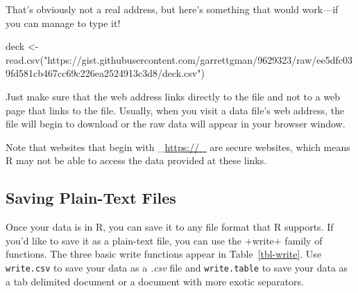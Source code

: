 \documentclass[
  letterpaper,
  DIV=11,
  numbers=noendperiod]{scrbook}
\newenvironment{Shaded}{\begin{snugshade}}{\end{snugshade}}
\newcommand{\FunctionTok}[1]{\textcolor[rgb]{0.28,0.35,0.67}{#1}}
\newcommand{\NormalTok}[1]{\textcolor[rgb]{0.00,0.23,0.31}{#1}}
\newcommand{\OtherTok}[1]{\textcolor[rgb]{0.00,0.23,0.31}{#1}}
\newcommand{\StringTok}[1]{\textcolor[rgb]{0.13,0.47,0.30}{#1}}
\begin{document}
That's obviously not a real address, but here's something that would
work---if you can manage to type it!

\begin{Shaded}
\begin{Highlighting}[]
\NormalTok{deck }\OtherTok{\textless{}{-}} \FunctionTok{read.csv}\NormalTok{(}\StringTok{"https://gist.githubusercontent.com/garrettgman/9629323/raw/ee5dfc039fd581cb467cc69c226ea2524913c3d8/deck.csv"}\NormalTok{)}
\end{Highlighting}
\end{Shaded}

Just make sure that the web address links directly to the file and not
to a web page that links to the file. Usually, when you visit a data
file's web address, the file will begin to download or the raw data will
appear in your browser window.

Note that websites that begin with \_\url{https://_} are secure
websites, which means R may not be able to access the data provided at
these links.

\subsection{Saving Plain-Text Files}\label{saving-plain-text-files}

Once your data is in R, you can save it to any file format that R
supports. If you'd like to save it as a plain-text file, you can use the
+write+ family of functions. The three basic write functions appear in
Table~\ref{tbl-write}. Use \texttt{write.csv} to save your data as a
\emph{.csv} file and \texttt{write.table} to save your data as a tab
delimited document or a document with more exotic separators.
\end{document}
